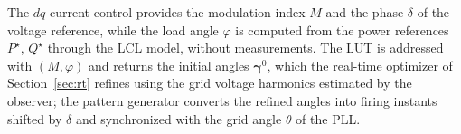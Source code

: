 \documentclass[conference]{IEEEtran}
\newcommand{\gv}{\boldsymbol{\gamma}}
\begin{document}

The $dq$ current control provides the modulation index $M$ and the phase
$\delta$ of the voltage reference, while the load angle $\varphi$ is computed
from the power references $P^\star$, $Q^\star$ through the LCL model, without
measurements. The LUT is addressed with $(M,\varphi)$ and returns the initial
angles $\gv^0$, which the real-time optimizer of Section~\ref{sec:rt} refines
using the grid voltage harmonics estimated by the observer; the pattern
generator converts the refined angles into firing instants shifted by
$\delta$ and synchronized with the grid angle $\theta$ of the PLL.
\end{document}
